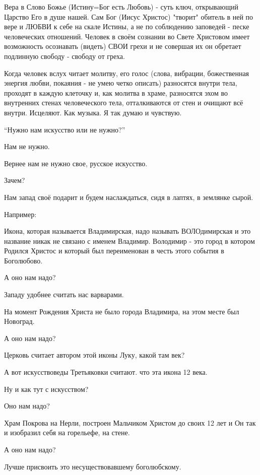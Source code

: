 \begin{itemize}
Вера в Слово Божье (Истину=Бог есть Любовь) - суть ключ, открывающий Царство
Его в душе нашей. Сам Бог (Иисус Христос) "творит" обитель в ней по вере и
ЛЮБВИ к себе на скале Истины, а не по соблюдению заповедей - песке человеческих
отношений. Человек в своём сознании во Свете Христовом имеет возможность
осознавать (видеть) СВОИ грехи и не совершая их он обретает подлинную свободу -
свободу от греха.


Когда человек вслух читает молитву, его голос (слова, вибрации, божественная
энергия любви, покаяния - не умею четко описать) разносятся внутри тела,
проходят в каждую клеточку и, как молитва в храме, разносятся эхом во
внутренних стенах человеческого тела, отталкиваются от стен и очищают всё
внутри. Исцеляют. Как музыка. Я так думаю и чувствую.


\enquote{Нужно нам искусство или не нужно?}

Нам не нужно.

Вернее нам не нужно свое, русское искусство.

Зачем?

Нам запад своё подарит и будем наслаждаться, сидя в лаптях, в землянке сырой.

Например:

Икона, которая называется Владимирская, надо называть ВОЛОдимирская и это
название никак не связано с именем Владимир. Володимир - это город в котором
Родился Христос и который был переименован в честь этого события в Боголюбово.

А оно нам надо?

Западу удобнее считать нас варварами.

На момент Рождения Христа не было города Владимира, на этом месте был Новоград.

А оно нам надо?

Церковь считает автором этой иконы Луку, какой там век?

А вот искусствоведы Третьяковки считают. что эта икона 12 века.

Ну и как тут с искусством?

Оно нам надо?

Храм Покрова на Нерли, построен Мальчиком Христом до своих 12 лет и Он так и
изобразил себя на горельефе, на стене.

А оно нам надо?

Лучше присвоить это несуществовавшему боголюбскому.


\end{itemize}
